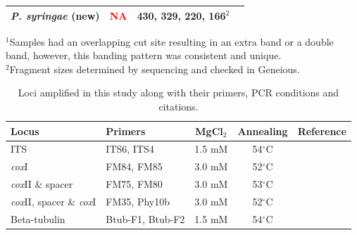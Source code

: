 \documentclass[12pt]{article}
\begin{document}
\begin{table}[!ht]
\begin{tabular}{lccc}
\emph{P. syringae} (new)	&	\textcolor{red}{NA}		&	430, 329, 220, 166$^{2}$	& \\
\hline
\end{tabular}
\label{tab:frags}
$^{1}$Samples had an overlapping cut site resulting in an extra band or a double band, however, this banding pattern was consistent and unique.\\
$^{2}$Fragment sizes determined by sequencing and checked in Geneious.
\end{table}






\begin{table}[!ht]
\caption{
Loci amplified in this study along with their primers, PCR conditions and citations.}
\begin{tabular}{llccc}
\hline
\textbf{Locus}	& \textbf{Primers}	&  \textbf{MgCl$_{2}$}   & \textbf{Annealing} &	\textbf{Reference} \\
\hline
ITS		&	ITS6, ITS4	& 1.5 mM & 54$^{\circ}$C &	\cite{grunwald_etal_2011} \\
\emph{cox}I		&	FM84, FM85	& 3.0 mM & 52$^{\circ}$C &	\cite{martin2003phylogenetic} \\
\emph{cox}II \& spacer	&	FM75, FM80	& 3.0 mM & 53$^{\circ}$C &	\cite{martin2003phylogenetic} \\
\emph{cox}II, spacer \& \emph{cox}I &	FM35, Phy10b	& 3.0 mM & 52$^{\circ}$C &	\cite{martin2000phylogenetic, martin2003phylogenetic} \\
Beta-tubulin	&	Btub-F1, Btub-F2 & 1.5 mM & 54$^{\circ}$C &	\cite{kroon2004phylogenetic, blair2008multi} \\
\hline
\end{tabular}
\label{tab:loci}
\end{table}
\end{document}
